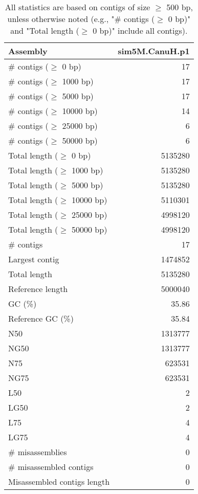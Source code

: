 \documentclass[12pt,a4paper]{article}
\begin{document}
\begin{table}[ht]
\begin{center}
\caption{All statistics are based on contigs of size $\geq$ 500 bp, unless otherwise noted (e.g., "\# contigs ($\geq$ 0 bp)" and "Total length ($\geq$ 0 bp)" include all contigs).}
\begin{tabular}{|l*{1}{|r}|}
\hline
Assembly & sim5M.CanuH.p1 \\ \hline
\# contigs ($\geq$ 0 bp) & 17 \\ \hline
\# contigs ($\geq$ 1000 bp) & 17 \\ \hline
\# contigs ($\geq$ 5000 bp) & 17 \\ \hline
\# contigs ($\geq$ 10000 bp) & 14 \\ \hline
\# contigs ($\geq$ 25000 bp) & 6 \\ \hline
\# contigs ($\geq$ 50000 bp) & 6 \\ \hline
Total length ($\geq$ 0 bp) & 5135280 \\ \hline
Total length ($\geq$ 1000 bp) & 5135280 \\ \hline
Total length ($\geq$ 5000 bp) & 5135280 \\ \hline
Total length ($\geq$ 10000 bp) & 5110301 \\ \hline
Total length ($\geq$ 25000 bp) & 4998120 \\ \hline
Total length ($\geq$ 50000 bp) & 4998120 \\ \hline
\# contigs & 17 \\ \hline
Largest contig & 1474852 \\ \hline
Total length & 5135280 \\ \hline
Reference length & 5000040 \\ \hline
GC (\%) & 35.86 \\ \hline
Reference GC (\%) & 35.84 \\ \hline
N50 & 1313777 \\ \hline
NG50 & 1313777 \\ \hline
N75 & 623531 \\ \hline
NG75 & 623531 \\ \hline
L50 & 2 \\ \hline
LG50 & 2 \\ \hline
L75 & 4 \\ \hline
LG75 & 4 \\ \hline
\# misassemblies & 0 \\ \hline
\# misassembled contigs & 0 \\ \hline
Misassembled contigs length & 0 \\ \hline

\end{tabular}
\end{center}
\end{table}
\end{document}

